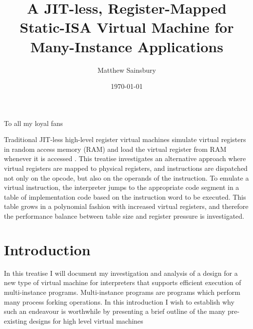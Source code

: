 



\title{A JIT-less, Register-Mapped Static-ISA Virtual Machine for Many-Instance Applications}
\author{Matthew Sainsbury}
\date{\today}

\begin{titlepage}
	\maketitle
\end{titlepage}


	To all my loyal fans

	Traditional JIT-less high-level register virtual machines simulate virtual registers in random access memory (RAM) and load the virtual register from RAM whenever it is accessed \citep{caseregistervm}. This treatise investigates an alternative approach where virtual registers are mapped to physical registers, and instructions are dispatched not only on the opcode, but also on the operands of the instruction. To emulate a virtual instruction, the interpreter jumps to the appropriate code segment in a table of implementation code based on the instruction word to be executed. This table grows in a polynomial fashion with increased virtual registers, and therefore the performance balance between table size and register pressure is investigated.


\tableofcontents

\chapter{Introduction}
	\startrealnumbers
	In this treatise I will document my investigation and analysis of a design for a new type of virtual machine for interpreters that supports efficient execution of multi-instance programs. Multi-instance programs are programs which perform many process forking operations. In this introduction I wish to establish why such an endeavour is worthwhile by presenting a brief outline of the many pre-existing designs for high level virtual machines
	
